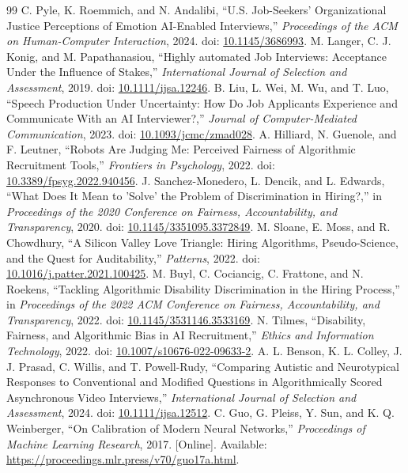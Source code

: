 \documentclass[journal]{IEEEtran}
\begin{document}
\begin{thebibliography}{99}
 C. Pyle, K. Roemmich, and N. Andalibi, ``U.S. Job-Seekers' Organizational Justice Perceptions of Emotion AI-Enabled Interviews,'' \emph{Proceedings of the ACM on Human-Computer Interaction}, 2024. doi: \href{https://doi.org/10.1145/3686993}{10.1145/3686993}.
 M. Langer, C. J. Konig, and M. Papathanasiou, ``Highly automated Job Interviews: Acceptance Under the Influence of Stakes,'' \emph{International Journal of Selection and Assessment}, 2019. doi: \href{https://doi.org/10.1111/ijsa.12246}{10.1111/ijsa.12246}.
 B. Liu, L. Wei, M. Wu, and T. Luo, ``Speech Production Under Uncertainty: How Do Job Applicants Experience and Communicate With an AI Interviewer?,'' \emph{Journal of Computer-Mediated Communication}, 2023. doi: \href{https://doi.org/10.1093/jcmc/zmad028}{10.1093/jcmc/zmad028}.
 A. Hilliard, N. Guenole, and F. Leutner, ``Robots Are Judging Me: Perceived Fairness of Algorithmic Recruitment Tools,'' \emph{Frontiers in Psychology}, 2022. doi: \href{https://doi.org/10.3389/fpsyg.2022.940456}{10.3389/fpsyg.2022.940456}.
 J. Sanchez-Monedero, L. Dencik, and L. Edwards, ``What Does It Mean to 'Solve' the Problem of Discrimination in Hiring?,'' in \emph{Proceedings of the 2020 Conference on Fairness, Accountability, and Transparency}, 2020. doi: \href{https://doi.org/10.1145/3351095.3372849}{10.1145/3351095.3372849}.
 M. Sloane, E. Moss, and R. Chowdhury, ``A Silicon Valley Love Triangle: Hiring Algorithms, Pseudo-Science, and the Quest for Auditability,'' \emph{Patterns}, 2022. doi: \href{https://doi.org/10.1016/j.patter.2021.100425}{10.1016/j.patter.2021.100425}.
 M. Buyl, C. Cociancig, C. Frattone, and N. Roekens, ``Tackling Algorithmic Disability Discrimination in the Hiring Process,'' in \emph{Proceedings of the 2022 ACM Conference on Fairness, Accountability, and Transparency}, 2022. doi: \href{https://doi.org/10.1145/3531146.3533169}{10.1145/3531146.3533169}.
 N. Tilmes, ``Disability, Fairness, and Algorithmic Bias in AI Recruitment,'' \emph{Ethics and Information Technology}, 2022. doi: \href{https://doi.org/10.1007/s10676-022-09633-2}{10.1007/s10676-022-09633-2}.
 A. L. Benson, K. L. Colley, J. J. Prasad, C. Willis, and T. Powell-Rudy, ``Comparing Autistic and Neurotypical Responses to Conventional and Modified Questions in Algorithmically Scored Asynchronous Video Interviews,'' \emph{International Journal of Selection and Assessment}, 2024. doi: \href{https://doi.org/10.1111/ijsa.12512}{10.1111/ijsa.12512}.
 C. Guo, G. Pleiss, Y. Sun, and K. Q. Weinberger, ``On Calibration of Modern Neural Networks,'' \emph{Proceedings of Machine Learning Research}, 2017. [Online]. Available: \url{https://proceedings.mlr.press/v70/guo17a.html}.
\end{thebibliography}
\end{document}
